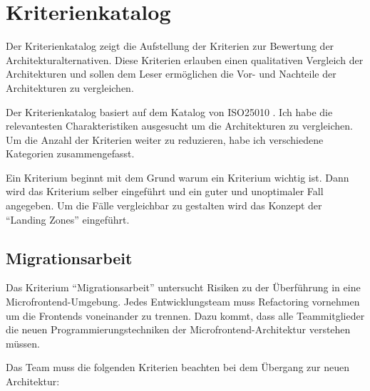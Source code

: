 \section{Kriterienkatalog}

\newcommand{\plus}{$+$}
\newcommand{\minus}{$-$}

Der Kriterienkatalog zeigt die Aufstellung der Kriterien zur Bewertung der Architekturalternativen. Diese Kriterien erlauben einen qualitativen Vergleich der Architekturen und sollen dem Leser ermöglichen die Vor- und Nachteile der Architekturen zu vergleichen.

Der Kriterienkatalog basiert auf dem Katalog von ISO25010 \cite{ISO25010}. Ich habe die relevantesten Charakteristiken ausgesucht um die Architekturen zu vergleichen. Um die Anzahl der Kriterien weiter zu reduzieren, habe ich verschiedene Kategorien zusammengefasst.

Ein Kriterium beginnt mit dem Grund warum ein Kriterium wichtig ist. Dann wird das Kriterium selber eingeführt und ein guter und unoptimaler Fall angegeben. Um die Fälle vergleichbar zu gestalten wird das Konzept der \enquote{Landing Zones}\cite{LandingZones2011} eingeführt.

\subsection{Migrationsarbeit}


Das Kriterium \enquote{Migrationsarbeit} untersucht Risiken zu der Überführung in eine Microfrontend-Umgebung. Jedes Entwicklungsteam muss Refactoring vornehmen um die Frontends voneinander zu trennen. Dazu kommt, dass alle Teammitglieder die neuen Programmierungstechniken der Microfrontend-Architektur verstehen müssen.

Das  Team muss die folgenden Kriterien beachten bei dem Übergang zur neuen Architektur:

